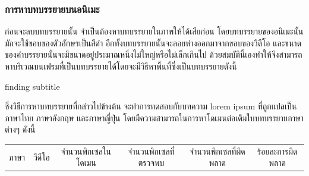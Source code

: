 \documentclass[hidelinks, a4paper,12pt]{article}
\numberwithin{equation}{section}							%
\numberwithin{equation}{section}
\begin{document}
{	
	\subsubsection{การหาบทบรรยายบนอนิเมะ}	
	\hspace{1cm}ก่อนจะลบบทบรรยายนั้น จำเป็นต้องหาบทบรรยายในภาพให้ได้เสียก่อน โดยบทบรรยายของอนิเมะนั้น มักจะใช้ขอบของตัวอักษรเป็นสีดำ อีกทั้งบทบรรยายนั้นจะลอยห่างออกมาจากขอบของวิดีโอ และขนาดของคำบรรยายนั้นจะมีขนาดอยู่ประมาณหนึ่งไม่ใหญ่หรือไม่เล็กเกินไป ด้วยสมบัตินี้เองทำให้จึงสามารถหาบริเวณบนเฟรมที่เป็นบทบรรยายได้โดยจะมีวิธีหาพื้นที่ซึ่งเป็นบทบรรยายดังนี้
	
	\vspace{1cm}
	
	\begin{algorithm}[H]
		\caption{finding subtitle}
	\end{algorithm}
	\clearpage
	\hspace{1cm} ซึ่งวิธีการหาบทบรรยายที่กล่าวไปข้างต้น จะทำการทดสอบกับบทความ lorem ipsum ที่ถูกแปลเป็นภาษาไทย ภาษาอังกฤษ และภาษาญี่ปุ่น โดยมีความสามารถในการหาโดเมนต่อเติมใบบทบรรยายภาษาต่างๆ ดังนี้
	\begin{table}[H]
		\centering
		\begin{tabular}[ht]{|l|c|c|c|c|c|}
			\hline
			ภาษา  & วีดีโอ & จำนวนพิกเซลในโดเมน & จำนวนพิกเซลที่ตรวจพบ & จำนวนพิกเซลที่ผิดพลาด & ร้อยละการผิดพลาด \\

\end{tabular}
\end{table}}
\end{document}
